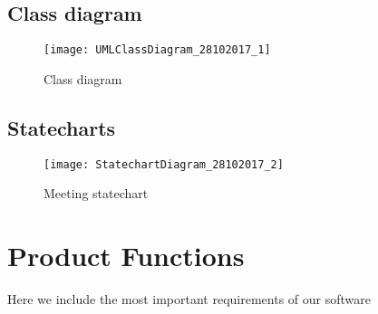 \documentclass[a4paper,leqno]{book}
\begin{document}
\subsection{Class diagram}
\begin{figure}[!h]
	\begin{center}
		\texttt{[image: UMLClassDiagram\_28102017\_1]}
	\end{center}
	\caption{Class diagram}
\end{figure}

\newpage
\subsection{Statecharts}
\begin{figure}[!h]
	\begin{centering}
		\texttt{[image: StatechartDiagram\_28102017\_2]}
		\end{centering}
	\caption{Meeting statechart}
\end{figure}

\newpage
\section{Product Functions}
Here we include the most important requirements of our software
\end{document}
